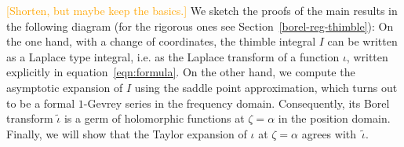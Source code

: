\documentclass{article}
\newcommand{\series}[1]{\tilde{#1}}
\newcommand{\laplace}{\mathcal{L}}
\newcommand{\borel}{\mathcal{B}}
\newcommand{\aexp}{\text{\ae}}
\theoremstyle{definition}
\theoremstyle{plain}
\begin{document}
\color{RoyalBlue}
\textcolor{orange}{[Shorten, but maybe keep the basics.]} We sketch the proofs of the main results in the following diagram (for the rigorous ones see Section~\ref{borel-reg-thimble}):
On the one hand, with a change of coordinates, the thimble integral $I$ can be written as a Laplace type integral, i.e. as the Laplace transform of a function $\iota$, written explicitly in equation~\eqref{eqn:formula}. 
On the other hand, we compute the asymptotic expansion of $I$ using the saddle point approximation, which turns out to be a formal $1$-Gevrey series in the frequency domain. Consequently, its Borel transform $\series{\iota}$ is a germ of holomorphic functions at $\zeta=\alpha$ in the position domain. Finally, we will show that the Taylor expansion of $\iota$ at $\zeta=\alpha$ agrees with~$\tilde{\iota}$.
\end{document}
